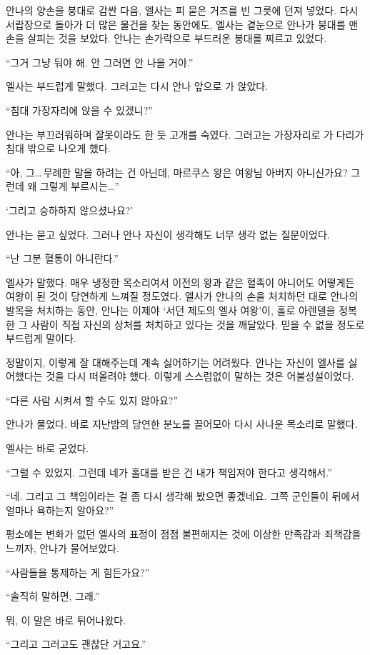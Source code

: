 안나의 양손을 붕대로 감싼 다음, 엘사는 피 묻은 거즈를 빈 그릇에 던져 넣었다. 다시 서랍장으로 돌아가 더 많은 물건을 찾는 동안에도, 엘사는 곁눈으로 안나가 붕대를 맨 손을 살피는 것을 보았다. 안나는 손가락으로 부드러운 붕대를 찌르고 있었다.

``그거 그냥 둬야 해. 안 그러면 안 나을 거야.''

엘사는 부드럽게 말했다. 그러고는 다시 안나 앞으로 가 앉았다.

``침대 가장자리에 앉을 수 있겠니?''

안나는 부끄러워하며 잘못이라도 한 듯 고개를 숙였다. 그러고는 가장자리로 가 다리가 침대 밖으로 나오게 했다.

``아, 그\ldots\,무례한 말을 하려는 건 아닌데, 마르쿠스 왕은 여왕님 아버지 아니신가요? 그런데 왜 그렇게 부르시는\ldots''

`그리고 승하하지 않으셨나요?'

안나는 묻고 싶었다. 그러나 안나 자신이 생각해도 너무 생각 없는 질문이었다.

``난 그분 혈통이 아니란다.''

엘사가 말했다. 매우 냉정한 목소리여서 이전의 왕과 같은 혈족이 아니어도 어떻게든 여왕이 된 것이 당연하게 느껴질 정도였다. 엘사가 안나의 손을 처치하던 대로 안나의 발목을 처치하는 동안, 안나는 이제야 `서던 제도의 엘사 여왕'이, 홀로 아렌델을 정복한 그 사람이 직접 자신의 상처를 처치하고 있다는 것을 깨달았다. 믿을 수 없을 정도로 부드럽게 말이다.

정말이지, 이렇게 잘 대해주는데 계속 싫어하기는 어려웠다. 안나는 자신이 엘사를 싫어했다는 것을 다시 떠올려야 했다. 이렇게 스스럼없이 말하는 것은 어불성설이었다.

``다른 사람 시켜서 할 수도 있지 않아요?''

안나가 물었다. 바로 지난밤의 당연한 분노를 끌어모아 다시 사나운 목소리로 말했다.

엘사는 바로 굳었다.

``그럴 수 있었지. 그런데 네가 홀대를 받은 건 내가 책임져야 한다고 생각해서.''

``네. 그리고 그 책임이라는 걸 좀 다시 생각해 봤으면 좋겠네요. 그쪽 군인들이 뒤에서 얼마나 욕하는지 알아요?''

평소에는 변화가 없던 엘사의 표정이 점점 불편해지는 것에 이상한 만족감과 죄책감을 느끼자, 안나가 물어보았다.

``사람들을 통제하는 게 힘든가요?''

``솔직히 말하면, 그래.''

뭐, 이 말은 바로 튀어나왔다.

``그리고 그러고도 괜찮단 거고요.''

